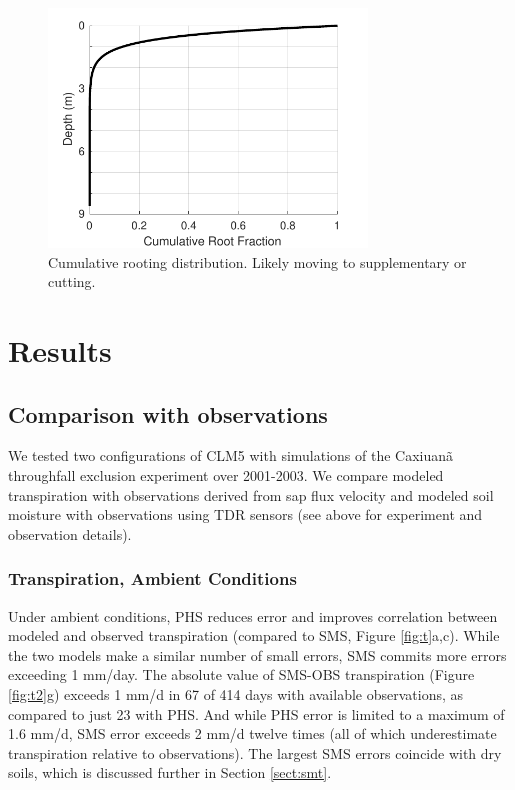 \documentclass[draft,linenumbers]{agujournal}
\begin{document}
  \begin{figure}[h]
     \centering
     \includegraphics[width=20pc]{../figs3/roots.pdf}
     \caption{Cumulative rooting distribution. Likely moving to supplementary or cutting.}
     \label{roots}
  \end{figure}

\section{Results}  

\subsection{Comparison with observations}
\label{sect:obs}

We tested two configurations of CLM5 with simulations of the Caxiuan\~a throughfall exclusion experiment over 2001-2003. We compare modeled transpiration with observations derived from sap flux velocity and modeled soil moisture with observations using TDR sensors (see above for experiment and observation details).

\subsubsection{Transpiration, Ambient Conditions}
Under ambient conditions, PHS reduces error and improves correlation between modeled and observed transpiration (compared to SMS, Figure \ref{fig:t}a,c).
While the two models make a similar number of small errors, SMS commits more errors exceeding 1 mm/day.
The absolute value of SMS-OBS transpiration (Figure \ref{fig:t2}g) exceeds 1 mm/d in 67 of 414 days with available observations, as compared to just 23 with PHS.
And while PHS error is limited to a maximum of 1.6 mm/d, SMS error exceeds 2 mm/d twelve times (all of which underestimate transpiration relative to observations).
The largest SMS errors coincide with dry soils, which is discussed further in Section \ref{sect:smt}. 
\end{document}
